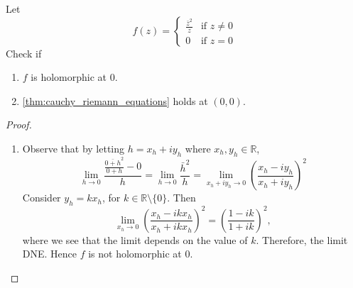 \documentclass[notoc,notitlepage]{tufte-book}
\begin{document}
\begin{eg}\label{eg:counterexample_for_converse_of_cre}
	Let
	\begin{equation*}
		f(z) = \begin{cases}
			\frac{\bar{z}^2}{z} & \text{if } z \neq 0 \\
			0		& \text{if } z = 0
		\end{cases}
	\end{equation*}
	Check if
	\begin{enumerate}
		\item $f$ is holomorphic at $0$.
		\item \cref{thm:cauchy_riemann_equations} holds at $(0, 0)$.
	\end{enumerate}

	\begin{proof}
		\begin{enumerate}
			\item Observe that by letting $h = x_h + iy_h$ where $x_h, y_h \in \mathbb{R}$,
			\begin{equation*}
				\lim_{h \to 0} \frac{\frac{\bar{0 + h}^2}{0 + h} - 0}{h} = \lim_{h \to 0} \frac{\bar{h}^2}{h} = \lim_{x_h + iy_h \to 0} \left(\frac{x_h - iy_h}{x_h + iy_h} \right)^2
			\end{equation*}
			Consider $y_h = kx_h$, for $k \in \mathbb{R} \setminus \{0\}$. Then
			\begin{equation*}
				\lim_{x_h \to 0} \left( \frac{x_h - ikx_h}{x_h + ikx_h} \right)^2 = \left( \frac{1 - ik}{1 + ik} \right)^2,
			\end{equation*}
			where we see that the limit depends on the value of $k$. Therefore, the limit DNE. Hence $f$ is not holomorphic at $0$.


\end{enumerate}
\end{proof}
\end{eg}
\end{document}
